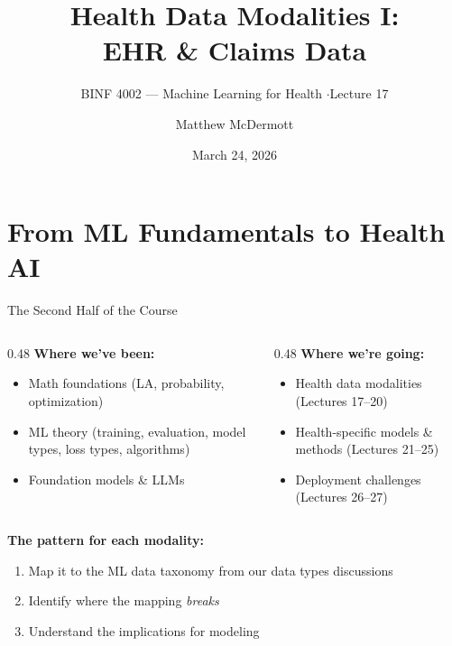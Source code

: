 \documentclass[aspectratio=169,10pt]{beamer}
\title{Health Data Modalities I:\\EHR \& Claims Data}
\subtitle{BINF 4002 --- Machine Learning for Health \quad$\cdot$\quad Lecture 17}
\author{Matthew McDermott}
\date{March 24, 2026}
\institute{Department of Biomedical Informatics\\Columbia University}
\begin{document}
\maketitle





\section{From ML Fundamentals to Health AI}



\begin{frame}{The Second Half of the Course}
\begin{columns}[T]
\begin{column}{0.48\textwidth}
\textbf{Where we've been:}
\begin{itemize}
    \item Math foundations (LA, probability, optimization)
    \item ML theory (training, evaluation, model types, loss types, algorithms)
    \item Foundation models \& LLMs
\end{itemize}
\end{column}
\begin{column}{0.48\textwidth}
\textbf{Where we're going:}
\begin{itemize}
    \item \alert{Health data modalities} (Lectures 17--20)
    \item Health-specific models \& methods (Lectures 21--25)
    \item Deployment challenges (Lectures 26--27)
\end{itemize}
\end{column}
\end{columns}

\vspace{1em}
\textbf{The pattern for each modality:}
\begin{enumerate}
    \item Map it to the ML data taxonomy from our data types discussions
    \item Identify where the mapping \emph{breaks}
    \item Understand the implications for modeling
\end{enumerate}
\end{frame}
\end{document}
